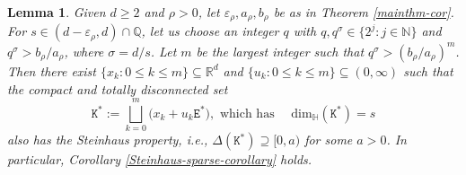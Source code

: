 \documentclass[a4paper,11pt]{amsart}
\newtheorem{lem}[thm]{\bf Lemma}
\numberwithin{equation}{section}
\begin{document}
\begin{lem} \label{Quasi-regular-Interval-Lemma} 
Given $d \geq 2$ and $\rho > 0$, let $\varepsilon_{\rho}, a_{\rho}, b_{\rho}$ be as in Theorem \ref{mainthm-cor}. For $s \in (d - \varepsilon_{\rho}, d) \cap \mathbb Q$, let us choose an integer $q$ with $q, q^{\sigma} \in \{2^j : j \in \mathbb N\}$ and $q^{\sigma} > b_{\rho}/a_{\rho}$, where $\sigma = d/s$. 
\vskip0.1in
\noindent Let $m$ be the largest integer such that $q^{\sigma} > (b_{\rho}/a_{\rho})^m$. Then there exist $\{x_k : 0 \leq k \leq m\} \subseteq \mathbb R^d$ and $\{u_k: 0 \leq k \leq m\} \subseteq (0, \infty)$ such that the compact and totally disconnected set 
\begin{equation} \mathtt K^{\ast} := \bigsqcup_{k=0}^{m} \bigl(x_k + u_k \mathtt E^{\ast}\bigr), \text{ which has } \quad \text{dim}_{\mathbb H}(\mathtt K^{\ast}) = s \label{def-K} \end{equation}    
also has the Steinhaus property, i.e., $\Delta(\mathtt K^{\ast}) \supseteq [0, a)$ for some $a > 0$. In particular, Corollary \ref{Steinhaus-sparse-corollary} holds. 
\end{lem} 
\end{document}
